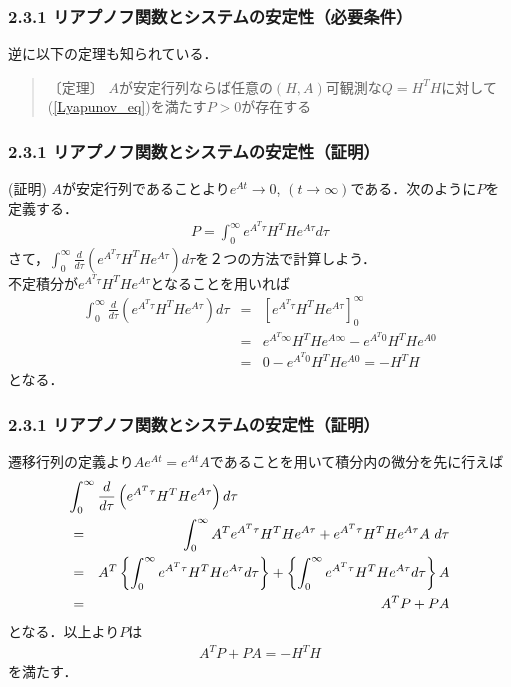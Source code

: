 \begin{frame}[t]
\frametitle{2.3.1 リアプノフ関数とシステムの安定性（必要条件）}

逆に以下の定理も知られている．
\\[3mm]


\begin{quote}
〔定理〕 $A$が安定行列ならば任意の$(H,A)$可観測な$Q=H^T H$に対して(\ref{Lyapunov_eq})を満たす$P>0$が存在する
\end{quote}

\end{frame}

\begin{frame}[t]
\frametitle{2.3.1 リアプノフ関数とシステムの安定性（証明）}
\noindent
(証明)
$A$が安定行列であることより$e^{At} \rightarrow 0$, $(t \rightarrow \infty)$である．次のように$P$を定義する．
\begin{eqnarray}
	P = \int_0^\infty e^{A^T \tau} H^T H e^{A \tau} d \tau
\end{eqnarray}
さて，$\int_0^\infty \frac{d}{d \tau} \left( e^{A^T \tau} H^T H e^{A \tau} \right) d \tau$を２つの方法で計算しよう．\\[3mm]

不定積分が$e^{A^T \tau} H^T H e^{A \tau}$となることを用いれば
\begin{eqnarray}
	\int_0^\infty \frac{d}{d \tau} \left( e^{A^T \tau} H^T H e^{A \tau} \right) d \tau 
	& = & \left [ e^{A^T \tau} H^T H e^{A \tau}  \right]_0^\infty
\nonumber \\
	& = & e^{A^T \infty} H^T H e^{A \infty} - e^{A^T 0} H^T H e^{A 0}
\nonumber \\
	& = & 0 - e^{A^T 0} H^T H e^{A 0} = - H^T H
\end{eqnarray}
となる．
\end{frame}

\begin{frame}[t]
\frametitle{2.3.1 リアプノフ関数とシステムの安定性（証明）}
遷移行列の定義より$A e^{At} = e^{At}A$であることを用いて積分内の微分を先に行えば
\begin{eqnarray}
\lefteqn{
	\int_0^\infty \frac{d}{d \tau} \left( e^{A^T \tau} H^T H e^{A \tau} \right) d \tau 
}
\nonumber \\
	& = & \int_0^\infty A^T e^{A^T \tau} H^T H e^{A \tau} + e^{A^T \tau} H^T H e^{A \tau} A \ d \tau 
\nonumber \\
	& = & A^T \left \{ \int_0^\infty e^{A^T \tau} H^T H e^{A \tau} d \tau \right \}
		+ \left \{ \int_0^\infty e^{A^T \tau} H^T H e^{A \tau} d \tau \right \} A
\nonumber \\
	& = & A^T P + P A
\end{eqnarray}
となる．以上より$P$は
\begin{eqnarray}
	A^T P + P A = - H^T H
\end{eqnarray}
を満たす．
\end{frame}

